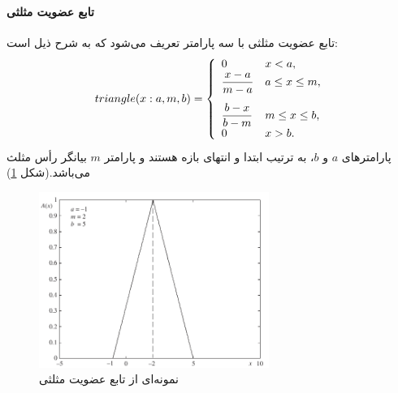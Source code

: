  \paragraph{تابع عضویت مثلثی}
 تابع عضویت مثلثی
  با سه پارامتر تعریف می‌شود که به شرح ذیل است:
 \begin{equation}\label{eq:e_fset_memfunc_triangle}
 triangle (x: a, m, b) = \left\{ 
 \begin{array}{ll}
 0 &  x < a, \\ \vspace{0.3cm}
\mathlarger{\frac{x-a}{m-a}} & a \leq x \leq m, \\ 
\mathlarger{ \frac{b-x}{b-m}} & m \leq x \leq b, \\
 0 & x > b.
 \end{array}
 \right.
 \end{equation}
پارامترهای $a$ و $b$، به ترتیب ابتدا و انتهای بازه هستند و پارامتر $m$ بیانگر رأس مثلث می‌باشد.(شکل \ref{fig:f_14})
\cite{Pedrycz2007}
\begin{figure}[h]
	\centering 
	\includegraphics[width=75mm]{Images/Fig14.png}
	\vspace{-0.5cm}
	\caption{نمونه‌ای از تابع عضویت مثلثی}\label{fig:f_14}
\end{figure}
